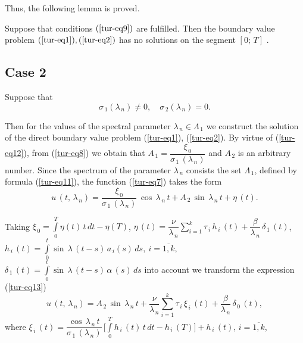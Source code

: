﻿\documentclass[
11pt,%
tightenlines,%
twoside,%
onecolumn,%
nofloats,%
nobibnotes,%
nofootinbib,%
superscriptaddress,%
noshowpacs,%
centertags]%
{revtex4}
\begin{document}
	Thus, the following lemma is proved.
	
\begin{lemma} Suppose that conditions $(\ref{tur-eq9})$ are fulfilled. Then the boundary value problem $(\ref{tur-eq1}), (\ref{tur-eq2})$ has no solutions on the segment $[0 ; \, T]$ .
\end{lemma}

\subsection{Case 2}

Suppose that
 \begin{equation} \label{tur-eq12}
 \sigma_{\, 1} (\lambda_{\, n}) \ne 0 , \quad  \sigma_{\, 2} (\lambda_{\, n}) = 0 .
\end{equation}

Then for the values of the spectral parameter $\lambda_{\, n} \in \Lambda_{\, 1}$ we construct the solution of the direct boundary value problem (\ref{tur-eq1}), (\ref{tur-eq2}). By virtue of (\ref{tur-eq12}), from (\ref{tur-eq8}) we obtain that $A_{\, 1}=\dfrac{\xi_{\, 0}}{\sigma_{\, 1} \, (\lambda_{\, n})}$ and
$A_{\, 2}$ is an arbitrary number. Since the spectrum of the parameter $\lambda_{\, n}$ consists the set $\Lambda_{\, 1}$, defined by formula (\ref{tur-eq11}), the function (\ref{tur-eq7}) takes the form
\begin{equation} \label{tur-eq13}
u \, (t , \, \lambda_{\, n})=\dfrac{\xi_{\, 0}}{\sigma_{\, 1} \, (\lambda_{\, n})} \, \cos \, \lambda_{\, n} \, t+A_{\, 2} \, \sin \, \lambda_{\, n} \, t+\eta \, (t) .
\end{equation}

Taking $\xi_{\, 0}=\int \limits_{0}^T \eta (t) \, t \, d t-\eta (T)$, $ \eta \, (t)=\dfrac{\nu}{\lambda_{\, n}} \sum \limits_{i=1}^{k}  \tau_{\, i} \, h_{\, i} \, (t)+\dfrac{\beta}{\lambda_{\, n}} \, \delta_{\, 1} \, (t) $, $h_{\, i} \, (t)= \int \limits_{0}^t \sin  \, \lambda \, (t-s) \, a_{\, i} (s) \, d s , \: i=\overline{1 , k} $,  $ \delta_{\, 1} \, (t)= \int \limits_{0}^t \sin  \, \lambda \, (t-s) \, \alpha \, (s) \, d s$ into account we transform the expression (\ref{tur-eq13})
\begin{equation} \label{tur-eq14}
u \, (t , \, \lambda_{\, n})=A_{\, 2} \, \sin \, \lambda_{\, n} \, t+\dfrac{\nu}{\lambda_{\, n}} \sum \limits_{i=1}^{k}  \tau_{\, i} \, \xi_{\, i} \, (t)+\dfrac{\beta}{\lambda_{\, n}} \, \delta_{\, 0} \, (t) ,
\end{equation}
where $\xi_{\, i} \, (t)=\dfrac{\cos \, \lambda_{\, n} \, t}{\sigma_{\, 1} \, (\lambda_{\, n})} \, \bigg[ \int \limits_{0}^T h_{\, i} \, (t) \, t \, d t-h_{\, i} \, (T) \bigg]+h_{\, i} \, (t)$,  $ i=\overline{1 , k} $,
\end{document}
